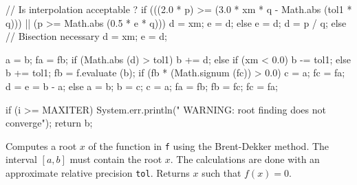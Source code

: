 \begin{code}
\begin{hide}
{{{            // Is interpolation acceptable ?
            if (((2.0 * p) >= (3.0 * xm * q - Math.abs (tol1 * q)))
                  || (p >= Math.abs (0.5 * e * q))) {
               d = xm;
               e = d;
            } else {
               e = d;
               d = p / q;
            }
         } else {
            // Bisection necessary
            d = xm;
            e = d;
         }

         a = b;
         fa = fb;
         if (Math.abs (d) > tol1)
            b += d;
         else if (xm < 0.0)
            b -= tol1;
         else
            b += tol1;
         fb = f.evaluate (b);
         if (fb * (Math.signum (fc)) > 0.0) {
            c = a;
            fc = fa;
            d = e = b - a;
         } else {
            a = b;
            b = c;
            c = a;
            fa = fb;
            fb = fc;
            fc = fa;
         }
      }

      if (i >= MAXITER)
         System.err.println(" WARNING:  root finding does not converge");
      return b;
   }\end{hide}
\end{code}
\begin{tabb} Computes a root $x$ of the function in \texttt{f} using the
    Brent-Dekker method. The interval $[a, b]$ must contain the root $x$.
    The calculations are done with an approximate relative precision
    \texttt{tol}.  Returns $x$ such that $f(x) = 0$.
 \end{tabb}
\begin{htmlonly}
\end{htmlonly}
